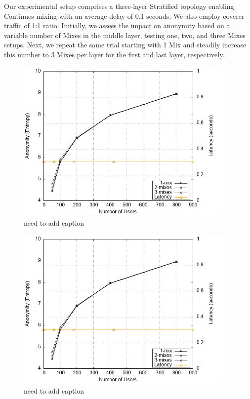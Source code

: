 \documentclass[logo,msc,cyber]{infthesis}   %
\begin{document}
Our experimental setup comprises a three-layer Stratified topology enabling
Continues mixing with an average delay of 0.1 seconds. We also employ coverer
traffic of 1:1 ratio. Initially, we assess the impact on anonymity based on a
variable number of Mixes in the middle layer, testing one, two, and three
Mixes setups. Next, we repeat the same trial starting with 1 Mix and steadily
increase this number to 3 Mixes per layer for the first and last layer,
respectively.

\begin{figure}[h!]
    \centering
    \includegraphics[height=8cm]{figures/simulator_extentions/first_layer_variable.png}
    \caption{need to add caption}
    \label{fig:first-layer-variable}
\end{figure} 

\begin{figure}[h!]
    \centering
    \includegraphics[height=8cm]{figures/simulator_extentions/first_layer_variable.png}
    \caption{need to add caption}
    \label{fig:first-layer-variable}
\end{figure} 
\end{document}

